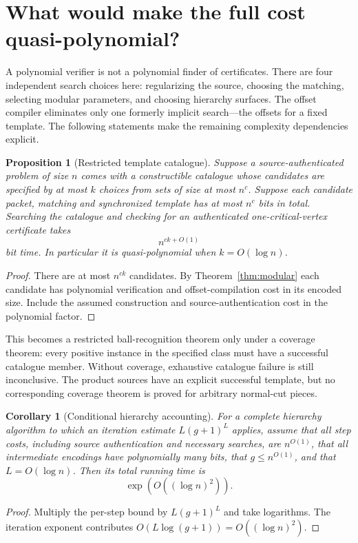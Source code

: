\documentclass[11pt,letterpaper]{article}
\newtheorem{proposition}[theorem]{Proposition}
\newtheorem{corollary}[theorem]{Corollary}
\theoremstyle{definition}
\theoremstyle{remark}\newtheorem{remark}[theorem]{Remark}
\begin{document}
\section{What would make the full cost quasi-polynomial?}
\label{sec:global}

A polynomial verifier is not a polynomial finder of certificates. There are four independent search choices here: regularizing the source, choosing the matching, selecting modular parameters, and choosing hierarchy surfaces. The offset compiler eliminates only one formerly implicit search---the offsets for a fixed template. The following statements make the remaining complexity dependencies explicit.

\begin{proposition}[Restricted template catalogue]
\label{prop:catalogue}
Suppose a source-authenticated problem of size $n$ comes with a constructible catalogue whose candidates are specified by at most $k$ choices from sets of size at most $n^c$. Suppose each candidate packet, matching and synchronized template has at most $n^c$ bits in total. Searching the catalogue and checking for an authenticated one-critical-vertex certificate takes
\[
                         n^{ck+O(1)}
\]
bit time. In particular it is quasi-polynomial when $k=O(\log n)$.
\end{proposition}
\begin{proof}
There are at most $n^{ck}$ candidates. By Theorem~\ref{thm:modular} each candidate has polynomial verification and offset-compilation cost in its encoded size. Include the assumed construction and source-authentication cost in the polynomial factor.
\end{proof}

This becomes a restricted ball-recognition theorem only under a coverage theorem: every positive instance in the specified class must have a successful catalogue member. Without coverage, exhaustive catalogue failure is still inconclusive. The product sources have an explicit successful template, but no corresponding coverage theorem is proved for arbitrary normal-cut pieces.

\begin{corollary}[Conditional hierarchy accounting]
\label{cor:global}
For a complete hierarchy algorithm to which an iteration estimate $L(g+1)^L$ applies, assume that all step costs, including source authentication and necessary searches, are $n^{O(1)}$, that all intermediate encodings have polynomially many bits, that $g\leq n^{O(1)}$, and that $L=O(\log n)$. Then its total running time is
\[
                             \exp(O((\log n)^2)).
\]
\end{corollary}
\begin{proof}
Multiply the per-step bound by $L(g+1)^L$ and take logarithms. The iteration exponent contributes $O(L\log(g+1))=O((\log n)^2)$.
\end{proof}
\end{document}
